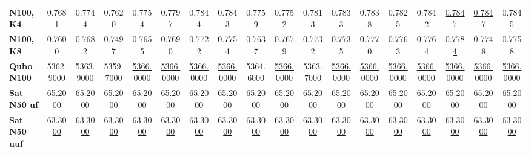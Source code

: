 \begin{table}[ht]
\begin{scriptsize}
\begin{tabular}{l | c c c c c c c c c c c c c c c c c}
\textbf{N100, K4}           & 0.7681                      & 0.7744                      & 0.7620                      & 0.7754                      & 0.7797                      & 0.7844                      & 0.7843                      & 0.7759                      & 0.7752                      & 0.7813                      & 0.7833                      & 0.7838                      & 0.7825                      & 0.7842                      & \underline{0.7847}          & \underline{0.7847}          & 0.7845                     \\
\textbf{N100, K8}           & 0.7600                      & 0.7682                      & 0.7497                      & 0.7655                      & 0.7690                      & 0.7722                      & 0.7754                      & 0.7637                      & 0.7679                      & 0.7732                      & 0.7735                      & 0.7770                      & 0.7763                      & 0.7764                      & \underline{0.7784}          & 0.7748                      & 0.7758                     \\
\hline
\textbf{Qubo N100}          & 5362.9000                   & 5363.9000                   & 5359.7000                   & \underline{5366.0000}       & \underline{5366.0000}       & \underline{5366.0000}       & \underline{5366.0000}       & 5364.6000                   & \underline{5366.0000}       & 5363.7000                   & \underline{5366.0000}       & \underline{5366.0000}       & \underline{5366.0000}       & \underline{5366.0000}       & \underline{5366.0000}       & \underline{5366.0000}       & \underline{5366.0000}      \\
\hline
\textbf{Sat N50 uf}         & \underline{65.2000}         & \underline{65.2000}         & \underline{65.2000}         & \underline{65.2000}         & \underline{65.2000}         & \underline{65.2000}         & \underline{65.2000}         & \underline{65.2000}         & \underline{65.2000}         & \underline{65.2000}         & \underline{65.2000}         & \underline{65.2000}         & \underline{65.2000}         & \underline{65.2000}         & \underline{65.2000}         & \underline{65.2000}         & \underline{65.2000}        \\
\hline
\textbf{Sat N50 uuf}        & \underline{63.3000}         & \underline{63.3000}         & \underline{63.3000}         & \underline{63.3000}         & \underline{63.3000}         & \underline{63.3000}         & \underline{63.3000}         & \underline{63.3000}         & \underline{63.3000}         & \underline{63.3000}         & \underline{63.3000}         & \underline{63.3000}         & \underline{63.3000}         & \underline{63.3000}         & \underline{63.3000}         & \underline{63.3000}         & \underline{63.3000}        \\

\end{tabular}
\end{scriptsize}
\end{table}
